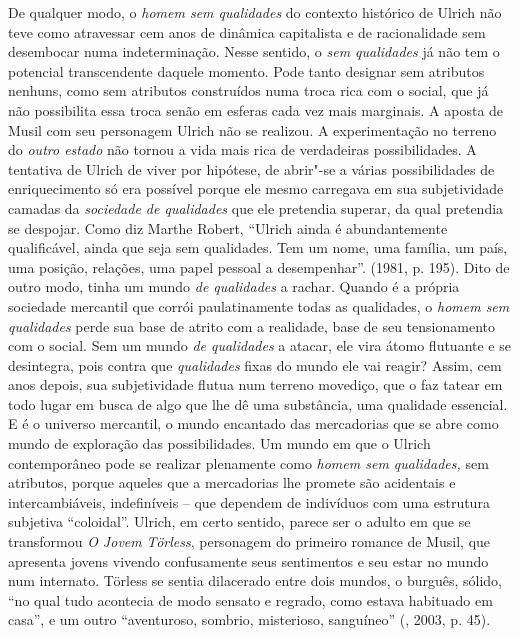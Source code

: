 De qualquer modo, o \emph{homem sem qualidades} do contexto histórico de
Ulrich não teve como atravessar cem anos de dinâmica capitalista e de
racionalidade sem desembocar numa indeterminação. Nesse sentido, o
\emph{sem qualidades} já não tem o potencial transcendente daquele
momento. Pode tanto designar sem atributos nenhuns, como sem atributos
construídos numa troca rica com o social, que já não possibilita essa
troca senão em esferas cada vez mais marginais. A aposta de Musil com
seu personagem Ulrich não se realizou. A experimentação no terreno do
\emph{outro estado} não tornou a vida mais rica de verdadeiras
possibilidades. A tentativa de Ulrich de viver por hipótese, de abrir"-se
a várias possibilidades de enriquecimento só era possível porque ele
mesmo carregava em sua subjetividade camadas da \emph{sociedade de
qualidades} que ele pretendia superar, da qual pretendia se despojar.
Como diz Marthe Robert, ``Ulrich ainda é abundantemente qualificável,
ainda que seja sem qualidades. Tem um nome, uma família, um país, uma
posição, relações, uma papel pessoal a desempenhar''. (1981, p. 195).
Dito de outro modo, tinha um mundo \emph{de qualidades} a rachar. Quando
é a própria sociedade mercantil que corrói paulatinamente todas as
qualidades, o \emph{homem sem qualidades} perde sua base de atrito com a
realidade, base de seu tensionamento com o social. Sem um mundo \emph{de
qualidades} a atacar, ele vira átomo flutuante e se desintegra, pois
contra que \emph{qualidades} fixas do mundo ele vai reagir? Assim, cem
anos depois, sua subjetividade flutua num terreno movediço, que o faz
tatear em todo lugar em busca de algo que lhe dê uma substância, uma
qualidade essencial. E é o universo mercantil, o mundo encantado das
mercadorias que se abre como mundo de exploração das possibilidades. Um
mundo em que o Ulrich contemporâneo pode se realizar plenamente como
\emph{homem sem qualidades,} sem atributos, porque aqueles que a
mercadorias lhe promete são acidentais e intercambiáveis, indefiníveis
-- que dependem de indivíduos com uma estrutura subjetiva ``coloidal''.
Ulrich, em certo sentido, parece ser o adulto em que se transformou
\emph{O Jovem} \emph{Törless}, personagem do primeiro romance de Musil,
que apresenta jovens vivendo confusamente seus sentimentos e seu estar
no mundo num internato. Törless se sentia dilacerado entre dois mundos,
o burguês, sólido, ``no qual tudo acontecia de modo sensato e regrado,
como estava habituado em casa'', e um outro ``aventuroso, sombrio,
misterioso, sanguíneo'' (, 2003, p. 45).


